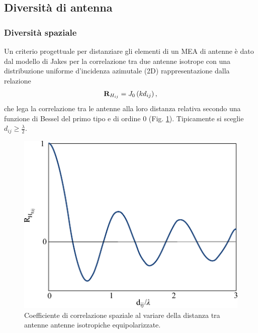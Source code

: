 \documentclass[technote]{IEEEtran}
\begin{document}
\subsection{Diversità di antenna}

\subsubsection{Diversità  spaziale}
\par Un criterio progettuale per distanziare gli elementi di un MEA di antenne è dato dal modello di Jakes \cite{DeFlavis} per la correlazione tra due antenne isotrope con una distribuzione uniforme d'incidenza azimutale (2D) rappresentazione dalla relazione
\[{{\bf{R}}_{{H_{ij}}}} = {J_0}\left( {k{d_{ij}}} \right),\]
che lega la correlazione tra le antenne alla loro distanza relativa secondo una funzione di Bessel del primo tipo e di ordine 0 (Fig. \ref{fig:18}). Tipicamente si sceglie ${d_{ij}} \ge \frac{\lambda }{2}$.
\begin{figure}[h]
\centering
\includegraphics[width=0.6\columnwidth]{figure18}
\caption{Coefficiente di correlazione spaziale al variare della distanza tra antenne antenne isotropiche equipolarizzate.}
\label{fig:18}
\end{figure}
\end{document}
